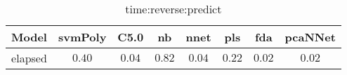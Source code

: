 \begin{table}[!ht]
	\centering
	\begin{tabular}{|c|c|c|c|c|c|c|c|}
		\hline
		Model & svmPoly & C5.0 & nb & nnet & pls & fda & pcaNNet \\ \hline
		elapsed & $0.40$ & $0.04$ & $0.82$ & $0.04$ & $0.22$ & $0.02$ & $0.02$ \\ \hline
	\end{tabular}
	\caption{time:reverse:predict}
	\label{tab:time:reverse:predict}
\end{table}
